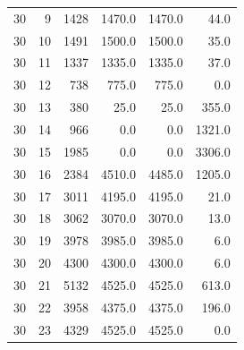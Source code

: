 \begin{longtable}{rrrrrr}
30 & 9 & 1428 & 1470.0 & 1470.0 & 44.0\\
30 & 10 & 1491 & 1500.0 & 1500.0 & 35.0\\
30 & 11 & 1337 & 1335.0 & 1335.0 & 37.0\\
30 & 12 & 738 & 775.0 & 775.0 & 0.0\\
30 & 13 & 380 & 25.0 & 25.0 & 355.0\\
30 & 14 & 966 & 0.0 & 0.0 & 1321.0\\
30 & 15 & 1985 & 0.0 & 0.0 & 3306.0\\
30 & 16 & 2384 & 4510.0 & 4485.0 & 1205.0\\
30 & 17 & 3011 & 4195.0 & 4195.0 & 21.0\\
30 & 18 & 3062 & 3070.0 & 3070.0 & 13.0\\
30 & 19 & 3978 & 3985.0 & 3985.0 & 6.0\\
30 & 20 & 4300 & 4300.0 & 4300.0 & 6.0\\
30 & 21 & 5132 & 4525.0 & 4525.0 & 613.0\\
30 & 22 & 3958 & 4375.0 & 4375.0 & 196.0\\
30 & 23 & 4329 & 4525.0 & 4525.0 & 0.0\\
\bottomrule
\end{longtable}